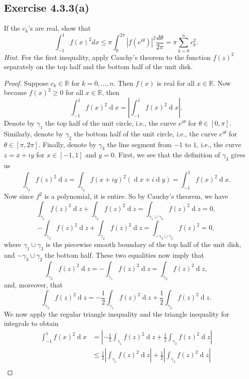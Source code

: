 \documentclass[12pt]{article}
\newenvironment{problem}
    {\begin{lrbox}{\mybox}\begin{minipage}{0.98\textwidth}}
    {\end{minipage}\end{lrbox}\framebox[\textwidth]{\usebox{\mybox}}}
\newcommand{\R}{\mathbb{R}} %
\newcommand{\<}{\left\langle} %
\renewcommand{\>}{\right\rangle} %
\renewcommand{\d}[1]{\operatorname{d}\!#1} %
\begin{document}
\subsection*{Exercise 4.3.3(a)}
\begin{problem}
    If the $c_k$'s are real, show that
    \[\int_{-1}^1 f(x)^2 dx \leq \pi \int_0^{2\pi}|f(e^{i\theta})|^2 \frac{d\theta}{2\pi} = \pi \sum_{k=0}^n c_k^2.\]
    \emph{Hint.} For the first inequality, apply Cauchy's theorem to the function $f(z)^2$ separately on the top half and the bottom half of the unit disk.
\end{problem}

\begin{proof}
    Suppose $c_k\in\R$ for $k = 0, \dots, n$. Then $f(x)$ is real for all $x \in \R$. Now because $f(x)^2 \geq 0$ for all $x \in \R$, then
    \[\int_{-1}^1 f(x)^2 \d{x} = \left| \int_{-1}^1 f(x)^2 \d{x} \right|.\]
    Denote by $\gamma_1$ the top half of the unit circle, i.e., the curve $e^{i\theta}$ for $\theta\in[0,\pi]$. Similarly, denote by $\gamma_2$ the bottom half of the unit circle, i.e., the curve $e^{i\theta}$ for $\theta\in[\pi,2\pi]$. Finally, denote by $\gamma_3$ the line segment from $-1$ to $1$, i.e., the curve $z = x + iy$ for $x \in [-1, 1]$ and $y = 0$. First, we see that the definition of $\gamma_3$ gives us
    \[\int_{\gamma_3} f(z)^2 \d{z} = \int_{\gamma_3} f(x + iy)^2 (\d{x} + i \d{y}) = \int_{-1}^1 f(x)^2 \d{x}.\]
    Now since $f^2$ is a polynomial, it is entire. So by Cauchy's theorem, we have
    \[\int_{\gamma_1} f(z)^2 \d{z} +  \int_{\gamma_3} f(z)^2 \d{z} = \int_{\gamma_1 \cup \gamma_3} f(z)^2 \d{z} = 0,\]
    \[- \int_{\gamma_3} f(z)^2 \d{z} + \int_{\gamma_2} f(z)^2 \d{z} = \int_{-\gamma_3 \cup \gamma_2} f(z)^2 = 0,\]
    where $\gamma_1 \cup \gamma_3$ is the piecewise smooth boundary of the top half of the unit disk, and $-\gamma_3 \cup \gamma_2$ the bottom half. These two equalities now imply that
    \[\int_{\gamma_3} f(z)^2 \d{z} = - \int_{\gamma_1} f(z)^2 \d{z} = \int_{\gamma_2} f(z)^2 \d{z},\]
    and, moreover, that
    \[\int_{\gamma_3} f(z)^2 \d{z} = - \frac12 \int_{\gamma_1} f(z)^2 \d{z} + \frac12 \int_{\gamma_2} f(z)^2 \d{z}.\]
    We now apply the regular triangle inequality and the triangle inequality for integrals to obtain
    \begin{align*}
        \int_{-1}^1 f(x)^2 \d{x}
            &= \left| - \frac12 \int_{\gamma_1} f(z)^2 \d{z} + \frac12 \int_{\gamma_2} f(z)^2 \d{z} \right| \\[1em]
            &\leq \frac12 \left| \int_{\gamma_1} f(z)^2 \d{z} \right| + \frac12 \left| \int_{\gamma_2} f(z)^2 \d{z} \right| \\[1em]

\end{align*}
\end{proof}
\end{document}
